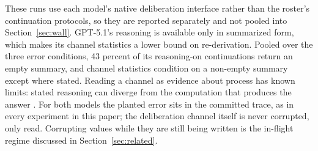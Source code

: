 These runs use each model's native deliberation interface rather than the roster's continuation protocols, so they are reported separately and not pooled into Section~\ref{sec:wall}. GPT-5.1's reasoning is available only in summarized form, which makes its channel statistics a lower bound on re-derivation. Pooled over the three error conditions, 43 percent of its reasoning-on continuations return an empty summary, and channel statistics condition on a non-empty summary except where stated. Reading a channel as evidence about process has known limits: stated reasoning can diverge from the computation that produces the answer \citep{lanham2023,turpin2023unfaithful,arcuschin2025wild,chen2025unfaithful}. For both models the planted error sits in the committed trace, as in every experiment in this paper; the deliberation channel itself is never corrupted, only read. Corrupting values while they are still being written is the in-flight regime discussed in Section~\ref{sec:related}.
